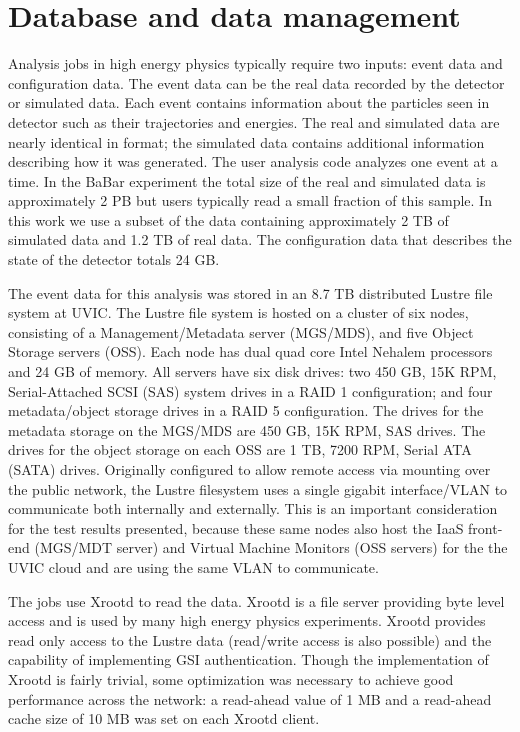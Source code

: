 \documentclass[10pt, conference, compsocconf]{IEEEtran}
\begin{document}
\section{Database and data management}

Analysis jobs in high energy physics typically require two inputs:
event data and configuration data.
The event data can be the real data recorded by the detector or
simulated data.
Each event contains information about the particles seen in detector 
such as their trajectories and energies.
The real and simulated data are nearly identical in format; the simulated 
data contains additional information describing how it was generated.
The user analysis code analyzes one event at a time.
In the BaBar experiment the total size of the real and simulated  
data is approximately 2 PB but users typically read a small
fraction of this sample.
In this work we use a subset of the data containing approximately
2 TB of simulated data and 1.2 TB of real data.  
The configuration data that describes the state of the detector totals 24 GB.

The event data for this analysis was stored in an 8.7 TB 
distributed Lustre file system at UVIC.  
The Lustre file system is hosted on a cluster of six nodes, consisting of a 
Management/Metadata server (MGS/MDS), and five Object Storage servers (OSS).
Each node has dual quad core Intel Nehalem processors and 24 GB of memory.
All servers have six disk drives: two 450 GB, 15K RPM, Serial-Attached 
SCSI (SAS) system drives in a RAID 1 configuration;
and four metadata/object storage drives in a RAID 5 configuration.
The drives for the metadata storage on the MGS/MDS are 450 GB, 15K RPM, 
SAS drives.
The drives for the object storage on each OSS are 1 TB, 
7200 RPM, Serial ATA (SATA) drives. 
Originally configured to allow remote access via mounting over the 
public network, the Lustre filesystem uses a single gigabit interface/VLAN 
to communicate both internally and externally.
This is an important consideration for the test results presented, 
because these same nodes also host the IaaS front-end (MGS/MDT server) 
and Virtual Machine Monitors (OSS servers) for the the UVIC cloud 
and are using the same VLAN to communicate.

The jobs use Xrootd \cite{xrootd} to read the data. 
Xrootd is a file server providing byte level access and is 
used by many high energy physics experiments. 
Xrootd provides read only access to the Lustre data (read/write access is 
also possible) and the capability of implementing GSI authentication. 
Though the implementation of Xrootd is fairly trivial, some optimization was 
necessary to achieve good performance across the network: a read-ahead value 
of 1 MB and a read-ahead cache size of 10 MB was set on each Xrootd client.   
\end{document}
